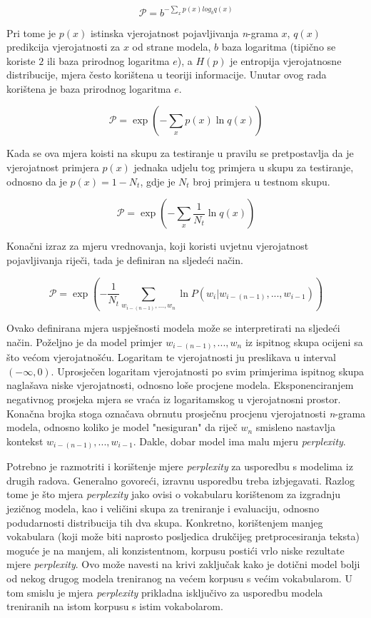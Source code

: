 \documentclass[times, utf8, diplomski, numeric]{fer}
\begin{document}
\[
\mathcal{P} = b^{- \sum_x p(x) log_b q(x)}
\]

Pri tome je $p(x)$ istinska vjerojatnost pojavljivanja \textit{n}-grama $x$, $q(x)$ predikcija vjerojatnosti za $x$ od strane modela, $b$ baza logaritma (tipično se koriste $2$ ili baza prirodnog logaritma $e$), a $H(p)$ je entropija vjerojatnosne distribucije, mjera često korištena u teoriji informacije. Unutar ovog rada korištena je baza prirodnog logaritma $e$.

\[
\mathcal{P} = \exp\left(- \sum_x p(x) \ln q(x) \right)
\]

Kada se ova mjera koisti na skupu za testiranje u pravilu se pretpostavlja da je vjerojatnost primjera $p(x)$ jednaka udjelu tog primjera u skupu za testiranje, odnosno da je $p(x) = 1 - N_t$, gdje je $N_t$ broj primjera u testnom skupu.

\[
\mathcal{P} = \exp\left(- \sum_x \frac{1}{N_t} \ln q(x) \right)
\]

Konačni izraz za mjeru vrednovanja, koji koristi uvjetnu vjerojatnost pojavljivanja riječi, tada je definiran na sljedeći način.

\[
\mathcal{P} = \exp\left(- \frac{1}{N_t} \sum_{w_{i - (n - 1)}, ..., w_n}  \ln P(w_i | w_{i - (n - 1)}, ... , w_{i - 1}) \right)
\]

Ovako definirana mjera uspješnosti modela može se interpretirati na sljedeći način. Poželjno je da model primjer $w_{i - (n - 1)}, ..., w_n$ iz ispitnog skupa ocijeni sa što većom vjerojatnošću. Logaritam te vjerojatnosti ju preslikava u interval $(- \infty, 0)$. Uprosječen logaritam vjerojatnosti po svim primjerima ispitnog skupa naglašava niske vjerojatnosti, odnosno loše procjene modela. Eksponenciranjem negativnog prosjeka mjera se vraća iz logaritamskog u vjerojatnosni prostor. Konačna brojka stoga označava obrnutu prosječnu procjenu vjerojatnosti \textit{n}-grama modela, odnosno koliko je model "nesiguran" da riječ $w_n$ smisleno nastavlja kontekst $w_{i - (n - 1)}, ... , w_{i - 1}$. Dakle, dobar model ima malu mjeru \textit{perplexity}.

Potrebno je razmotriti i korištenje mjere \textit{perplexity} za usporedbu s modelima iz drugih radova. Generalno govoreći, izravnu usporedbu treba izbjegavati. Razlog tome je što mjera \textit{perplexity} jako ovisi o vokabularu korištenom za izgradnju jezičnog modela, kao i veličini skupa za treniranje i evaluaciju, odnosno podudarnosti distribucija tih dva skupa. Konkretno, korištenjem manjeg vokabulara (koji može biti naprosto posljedica drukčijeg pretprocesiranja teksta) moguće je na manjem, ali konzistentnom, korpusu postići vrlo niske rezultate mjere \textit{perplexity}. Ovo može navesti na krivi zaključak kako je dotični model bolji od nekog drugog modela treniranog na većem korpusu s većim vokabularom. U tom smislu je mjera \textit{perplexity} prikladna isključivo za usporedbu modela treniranih na istom korpusu s istim vokabolarom.
\end{document}
